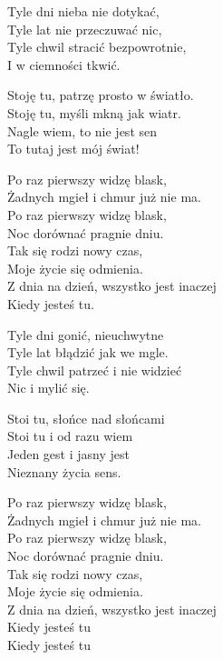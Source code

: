 \begin{text}
    Tyle dni nieba nie dotykać,\\
    Tyle lat nie przeczuwać nic,\\
    Tyle chwil stracić bezpowrotnie,\\
    I w ciemności tkwić.

    Stoję tu, patrzę prosto w światło.\\
    Stoję tu, myśli mkną jak wiatr.\\
    Nagle wiem, to nie jest sen\\
    To tutaj jest mój świat!

    Po raz pierwszy widzę blask,\\
    Żadnych mgieł i chmur już nie ma.\\
    Po raz pierwszy widzę blask,\\
    Noc dorównać pragnie dniu.\\
    Tak się rodzi nowy czas,\\
    Moje życie się odmienia.\\
    Z dnia na dzień, wszystko jest inaczej\\
    Kiedy jesteś tu.

    Tyle dni gonić, nieuchwytne\\
    Tyle lat błądzić jak we mgle.\\
    Tyle chwil patrzeć i nie widzieć\\
    Nic i mylić się.

    Stoi tu, słońce nad słońcami\\
    Stoi tu i od razu wiem\\
    Jeden gest i jasny jest\\
    Nieznany życia sens.

    Po raz pierwszy widzę blask,\\
    Żadnych mgieł i chmur już nie ma.\\
    Po raz pierwszy widzę blask,\\
    Noc dorównać pragnie dniu.\\
    Tak się rodzi nowy czas,\\
    Moje życie się odmienia.\\
    Z dnia na dzień, wszystko jest inaczej\\
    Kiedy jesteś tu\\
    \hfill\break
    Kiedy jesteś tu
\end{text}

